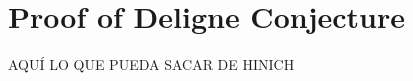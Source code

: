 \documentclass[TFM.tex]{subfiles}
\begin{document}
\chapter{Proof of Deligne Conjecture}

AQUÍ LO QUE PUEDA SACAR DE HINICH
\end{document}

